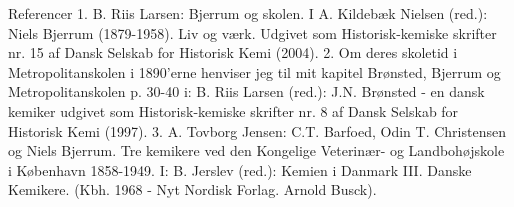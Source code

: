 Referencer
1. B. Riis Larsen: Bjerrum og skolen. I A. Kildebæk Nielsen (red.): Niels Bjerrum
(1879-1958). Liv og værk. Udgivet som Historisk-kemiske skrifter nr. 15 af Dansk
Selskab for Historisk Kemi (2004).
2. Om deres skoletid i Metropolitanskolen i 1890'erne henviser jeg til mit
kapitel Brønsted, Bjerrum og Metropolitanskolen p. 30-40 i: B. Riis Larsen (red.):
J.N. Brønsted - en dansk kemiker udgivet som Historisk-kemiske skrifter nr. 8
af Dansk Selskab for Historisk Kemi (1997).
3. A. Tovborg Jensen: C.T. Barfoed, Odin T. Christensen og Niels Bjerrum. Tre
kemikere ved den Kongelige Veterinær- og Landbohøjskole i København 1858-1949. I:
B. Jerslev (red.): Kemien i Danmark III. Danske Kemikere. (Kbh. 1968 - Nyt Nordisk
Forlag. Arnold Busck).
